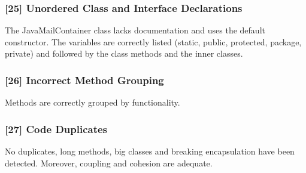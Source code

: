 \subsubsection{[25] Unordered Class and Interface Declarations}
The JavaMailContainer class lacks documentation and uses the default constructor. 
The variables are correctly listed (static, public, protected, package, private) and followed by the class methods and the inner classes.


\subsubsection{[26] Incorrect Method Grouping}
Methods are correctly grouped by functionality.

\subsubsection{[27] Code Duplicates}
No duplicates, long methods, big classes and breaking encapsulation have been detected.
Moreover, coupling and cohesion are adequate.